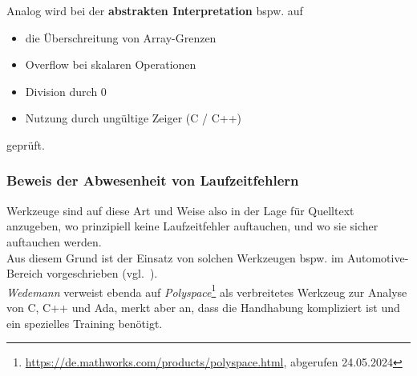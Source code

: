\noindent
Analog wird bei der \textbf{abstrakten Interpretation} bspw. auf
\begin{itemize}
    \item die Überschreitung von Array-Grenzen
    \item Overflow bei skalaren Operationen
    \item Division durch 0
    \item Nutzung durch ungültige Zeiger (C / C++)
\end{itemize}
\noindent
geprüft.

\subsubsection*{Beweis der Abwesenheit von Laufzeitfehlern}
Werkzeuge sind auf diese Art und Weise also in der Lage für Quelltext anzugeben, wo prinzipiell keine Laufzeitfehler auftauchen, und wo sie sicher auftauchen werden.\\
Aus diesem Grund ist der Einsatz von solchen Werkzeugen bspw. im Automotive-Bereich vorgeschrieben (vgl.~\cite[36]{Wed09c}).\\
\textit{Wedemann} verweist ebenda auf \textit{Polyspace}\footnote{
\url{https://de.mathworks.com/products/polyspace.html}, abgerufen 24.05.2024
} als verbreitetes Werkzeug zur Analyse von C, C++ und Ada, merkt aber an, dass die Handhabung kompliziert ist und ein spezielles Training benötigt.
